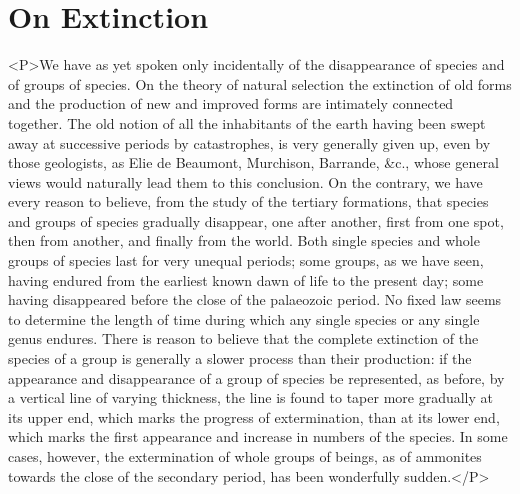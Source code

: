 \section{On Extinction}
<P>We have as yet spoken only incidentally of the disappearance of species and of groups of species. On the theory of natural selection the extinction of old forms and the production of new and improved forms are intimately connected together. The old notion of all the inhabitants of the earth having been swept away at successive periods by catastrophes, is very generally given up, even by those geologists, as Elie de Beaumont, Murchison, Barrande, \&c., whose general views would naturally lead them to this conclusion. On the contrary, we have every reason to believe, from the study of the tertiary formations, that species and groups of species gradually disappear, one after another, first from one spot, then from another, and finally from the world. Both single species and whole groups of species last for very unequal periods; some groups, as we have seen, having endured from the earliest known dawn of life to the present day; some having disappeared before the close of the palaeozoic period. No fixed law seems to determine the length of time during which any single species or any single genus endures.  There is reason to believe that the complete extinction of the species of a group is generally a slower process than their production: if the appearance and disappearance of a group of species be represented, as before, by a vertical line of varying thickness, the line is found to taper more gradually at its upper end, which marks the progress of extermination, than at its lower end, which marks the first appearance and increase in numbers of the species. In some cases, however, the extermination of whole groups of beings, as of ammonites towards the close of the secondary period, has been wonderfully sudden.</P>
